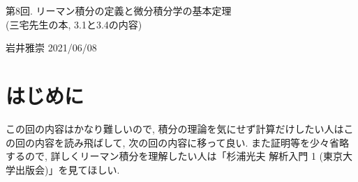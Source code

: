 \documentclass[dvipdfmx,a4paper,11pt]{article}
\theoremstyle{definition}
\begin{document}
\begin{center}
{\Large 第8回. リーマン積分の定義と微分積分学の基本定理 \\ (三宅先生の本, 3.1と3.4の内容)}
\end{center}

\begin{flushright}
 岩井雅崇 2021/06/08
\end{flushright}


\section{はじめに}
 この回の内容はかなり難しいので, 積分の理論を気にせず計算だけしたい人はこの回の内容を読み飛ばして, 次の回の内容に移って良い.
 また証明等を少々省略するので, 詳しくリーマン積分を理解したい人は「杉浦光夫 解析入門 1 (東京大学出版会)」を見てほしい.
 
\end{document}
